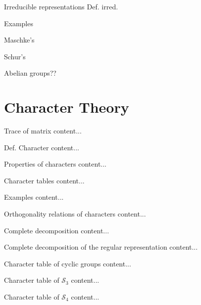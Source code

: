 \documentclass[handout, 10pt]{beamer}
\newcommand{\Sym}{\mathcal{S}}
\begin{document}
	\begin{frame}{Irreducible representations}
		Def. irred.
		
		Examples
		
		Maschke's
		
		Schur's
		
		Abelian groups??
	\end{frame}
	
	\section{Character Theory}
	
	\begin{frame}{Trace of matrix}
		content...
	\end{frame}
	
	\begin{frame}{Def. Character}
		content...
	\end{frame}
	
	\begin{frame}{Properties of characters}
		content...
	\end{frame}
	
	\begin{frame}{Character tables}
		content...
	\end{frame}
	
	\begin{frame}{Examples}
		content...
	\end{frame}
	
	\begin{frame}{Orthogonality relations of characters}
		content...
	\end{frame}
	
	\begin{frame}{Complete decomposition}
		content...
	\end{frame}
	
	\begin{frame}{Complete decomposition of the regular representation}
		content...
	\end{frame}
	
	\begin{frame}{Character table of cyclic groups}
		content...
	\end{frame}
	
	\begin{frame}{Character table of $\Sym_3$}
		content...
	\end{frame}
	
	\begin{frame}{Character table of $\Sym_4$}
		content...
	\end{frame}
	
\end{document}
